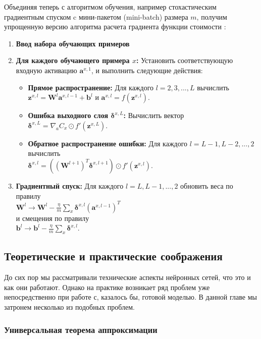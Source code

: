 Объединяя теперь с алгоритмом обучения, например стохастическим градиентным 
спуском c мини-пакетом (mini-batch) размера $m$, получим упрощенную версию 
алгоритма расчета градиента функции стоимости \cite{NN_Nielsen}:
\begin{enumerate}
    \item \textbf{Ввод набора обучающих примеров}
    \item \textbf{Для каждого обучающего примера $x$:} Установить соответствующую входную активацию $\bm{a}^{x,1}$, и выполнить следующие действия:
    \begin{itemize}
        \item \textbf{Прямое распространение:} Для каждого $l=2,3,...,L$ вычислить \\$\bm{z}^{x,l}=\bm{W}^l \bm{a}^{x,l-1} + \bm{b}^l$ и $\bm{a}^{x,l} = f(\bm{z}^{x,l})$. 
        \item \textbf{Ошибка выходного слоя $\bm{\delta}^{x,L}$:} Вычислить вектор\\ $\bm{\delta}^{x,L}=\nabla_a C_x \odot f'(\bm{z}^{x,L})$.
        \item \textbf{Обратное распространение ошибки:} Для каждого $l=L-1, L-2, ..., 2$ вычислить \\$\bm{\delta}^{x,l}=((\bm{W}^{l+1})^T \bm{\delta}^{x,l+1}) \odot f'(\bm{z}^{x,l})$.
    \end{itemize}
    \item \textbf{Градиентный спуск:} Для каждого $l=L,L-1,...,2$ обновить веса по правилу\\$\bm{W}^l \rightarrow \bm{W}^l - \frac{\eta}{m} \sum_x \bm{\delta}^{x,l} (\bm{a}^{x,l-1})^T$\\и смещения по правилу\\$\bm{b}^l \rightarrow \bm{b}^l - \frac{\eta}{m} \sum_x \bm{\delta}^{x,l}$.
\end{enumerate}

\subsection{Теоретические и практические соображения}

До сих пор мы рассматривали технические аспекты нейронных сетей, что это и как они работают. 
Однако на практике возникает ряд проблем уже непосредственно при работе с, казалось бы, готовой моделью. 
В данной главе мы затронем несколько из подобных проблем.

\subsubsection{Универсальная теорема аппроксимации}

